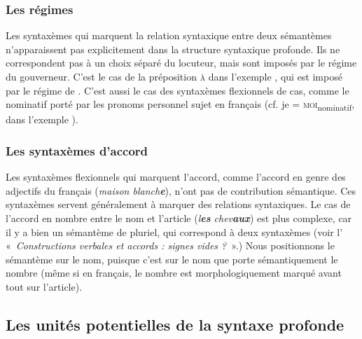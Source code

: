 \subsubsection{Les régimes}
Les syntaxèmes qui marquent la relation syntaxique entre deux sémantèmes n’apparaissent pas explicitement dans la structure syntaxique profonde. Ils ne correspondent pas à un choix séparé du locuteur, mais sont imposés par le régime du gouverneur. C’est le cas de la préposition \textsc{à} dans l’exemple , qui est imposé par le régime de . C’est aussi le cas des syntaxèmes flexionnels de cas, comme le nominatif porté par les pronoms personnel sujet en français (cf. je = \textsc{moi}\textsubscript{nominatif}, dans l’exemple ).

\subsubsection{Les syntaxèmes d’accord} 
Les syntaxèmes flexionnels qui marquent l’accord, comme l’accord en genre des adjectifs du français (\textit{maison blanch\textbf{e}}), n’ont pas de contribution sémantique. Ces syntaxèmes servent généralement à marquer des relations syntaxiques. Le cas de l’accord en nombre entre le nom et l’article (\textit{l\textbf{es} chev\textbf{aux}}) est plus complexe, car il y a bien un sémantème de pluriel, qui correspond à deux syntaxèmes (voir l’ «~\textit{Constructions verbales et accords : signes vides ?}~».) Nous positionnons le sémantème sur le nom, puisque c’est sur le nom que porte sémantiquement le nombre (même si en français, le nombre est morphologiquement marqué avant tout sur l’article).

\subsection{Les unités potentielles de la syntaxe profonde}\label{sec:13-potentiel}

